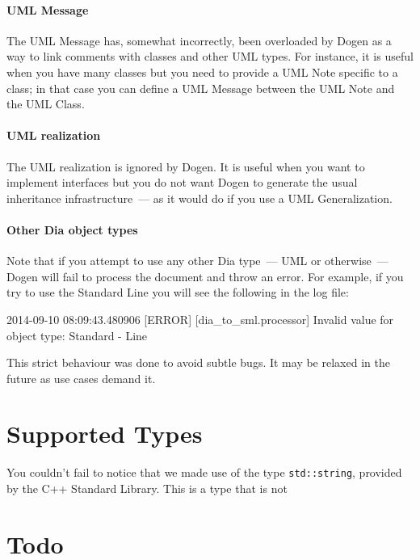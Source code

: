 \documentclass{book}
\begin{document}
\paragraph{UML Message}

The UML Message has, somewhat incorrectly, been overloaded by Dogen as
a way to link comments with classes and other UML types. For instance,
it is useful when you have many classes but you need to provide a UML
Note specific to a class; in that case you can define a UML Message
between the UML Note and the UML Class.

\paragraph{UML realization}

The UML realization is ignored by Dogen. It is useful when you want to
implement interfaces but you do not want Dogen to generate the usual
inheritance infrastructure~--- as it would do if you use a UML
Generalization.

\paragraph{Other Dia object types}

Note that if you attempt to use any other Dia type~--- UML or
otherwise~--- Dogen will fail to process the document and throw an
error. For example, if you try to use the Standard Line you will see
the following in the log file:

\begin{pseudocode}[backgroundcolor=\color{lightgray}]
2014-09-10 08:09:43.480906 [ERROR] [dia_to_sml.processor] Invalid value for object type: Standard - Line
\end{pseudocode}

This strict behaviour was done to avoid subtle bugs. It may be relaxed
in the future as use cases demand it.

\section{Supported Types}

You couldn't fail to notice that we made use of the type
\texttt{std::string}, provided by the C++ Standard Library. This is a
type that is not

\section{Todo}
\end{document}
